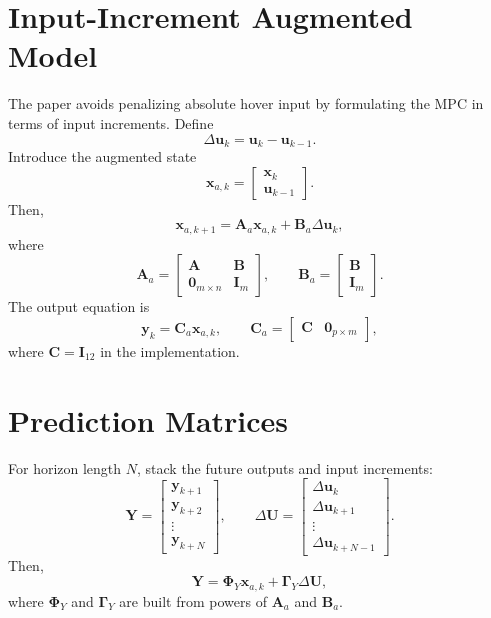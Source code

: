 \documentclass[12pt,a4paper]{article}
\begin{document}
\section{Input-Increment Augmented Model}

The paper avoids penalizing absolute hover input by formulating the MPC in terms of input increments. Define
\begin{equation}
\Delta\bm{u}_k=\bm{u}_k-\bm{u}_{k-1}.
\end{equation}
Introduce the augmented state
\begin{equation}
\bm{x}_{a,k}=
\begin{bmatrix}
\bm{x}_k\\
\bm{u}_{k-1}
\end{bmatrix}.
\end{equation}
Then,
\begin{equation}
\bm{x}_{a,k+1}=
\bm{A}_a\bm{x}_{a,k}+\bm{B}_a\Delta\bm{u}_k,
\end{equation}
where
\begin{equation}
\bm{A}_a=
\begin{bmatrix}
\bm{A} & \bm{B}\\
\bm{0}_{m\times n} & \bm{I}_{m}
\end{bmatrix},\qquad
\bm{B}_a=
\begin{bmatrix}
\bm{B}\\
\bm{I}_{m}
\end{bmatrix}.
\end{equation}
The output equation is
\begin{equation}
\bm{y}_k=\bm{C}_a\bm{x}_{a,k},\qquad
\bm{C}_a=
\begin{bmatrix}
\bm{C} & \bm{0}_{p\times m}
\end{bmatrix},
\end{equation}
where $\bm{C}=\bm{I}_{12}$ in the implementation.

\section{Prediction Matrices}

For horizon length $N$, stack the future outputs and input increments:
\begin{equation}
\bm{Y}=
\begin{bmatrix}
\bm{y}_{k+1}\\
\bm{y}_{k+2}\\
\vdots\\
\bm{y}_{k+N}
\end{bmatrix},\qquad
\Delta\bm{U}=
\begin{bmatrix}
\Delta\bm{u}_{k}\\
\Delta\bm{u}_{k+1}\\
\vdots\\
\Delta\bm{u}_{k+N-1}
\end{bmatrix}.
\end{equation}
Then,
\begin{equation}
\bm{Y}=\bm{\Phi}_Y\bm{x}_{a,k}+\bm{\Gamma}_Y\Delta\bm{U},
\label{eq:prediction_output}
\end{equation}
where $\bm{\Phi}_Y$ and $\bm{\Gamma}_Y$ are built from powers of $\bm{A}_a$ and $\bm{B}_a$.
\end{document}
